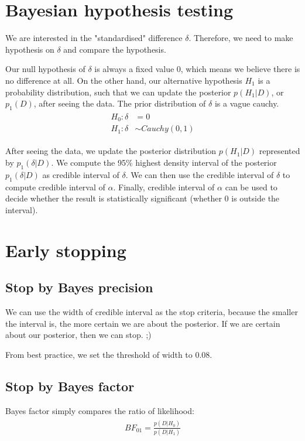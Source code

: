 \documentclass[paper=a4, fontsize=11pt]{scrartcl} %
\numberwithin{equation}{section} %
\numberwithin{figure}{section} %
\numberwithin{table}{section} %
\begin{document}
\section{Bayesian hypothesis testing}
\label{sec:byt}
We are interested in the "standardised" difference $\delta$. Therefore, we need to make hypothesis on $\delta$ and compare the hypothesis. 

Our null hypothesis of $\delta$ is always a fixed value $0$, which means we believe there is no difference at all. On the other hand, our alternative hypothesis $H_1$ is a probability distribution, such that we can update the posterior $p(H_1 |D)$, or $p_1(D)$, after seeing the data. The prior distribution of $\delta$ is a vague cauchy.
\begin{align}
\begin{split}
H_0:  \delta &= 0 \\
H_1:  \delta &\sim \mathit{Cauchy} (0, 1)
\end{split}	
\end{align}

After seeing the data, we update the posterior distribution $p(H_1 |D)$ represented by $p_1( \delta | D)$. 
We compute the 95\% highest density interval of the posterior $p_1( \delta | D)$ as credible interval of $\delta$. We can then use the credible interval of $\delta$ to compute credible interval of $\alpha$. Finally, credible interval of $\alpha$ can be used to decide whether the result is statistically significant (whether 0 is outside the interval).


\section{Early stopping}

\subsection{Stop by Bayes precision}
We can use the width of credible interval as the stop criteria, because the smaller the interval is, the more certain we are about the posterior.
If we are certain about our posterior, then we can stop. ;)

From best practice, we set the threshold of width to 0.08.

\subsection{Stop by Bayes factor}
Bayes factor simply compares the ratio of likelihood:
\begin{align}
\begin{split}
BF_{01} = \frac{p(D|H_0)}{p(D|H_1)}
\end{split}
\end{align}
\end{document}
